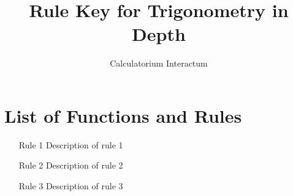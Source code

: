 \documentclass{article}
\title{Rule Key for Trigonometry in Depth}
\author{Calculatorium Interactum}
\begin{document}
\maketitle

\section{List of Functions and Rules}

\begin{enumerate}
    \item [Rule 1] Description of rule 1
    \item [Rule 2] Description of rule 2
    \item [Rule 3] Description of rule 3
\end{enumerate}
\end{document}
